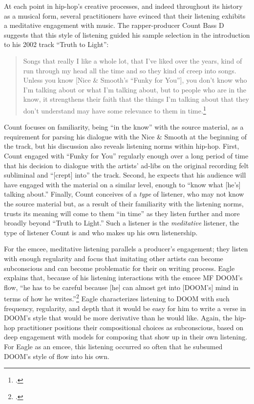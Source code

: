 At each point in hip-hop's creative processes, and indeed throughout its history as a musical form, several 
practitioners have evinced that their listening exhibits a meditative engagement with music. The rapper-producer
Count Bass D suggests that this style of listening guided his sample selection in the introduction to his 2002
track ``Truth to Light'': 
    \begin{quote}
        \small Songs that really I like a whole lot, that I've liked over the years, kind of run through my head all
        the time and so they kind of creep into songs. \textellipsis Unless you know [Nice \& Smooth's ``Funky
        for You''], you don't know who I'm talking about or what I'm talking about, but to people who are in
        the know, it strengthens their faith that the things I'm talking about that they don't understand may
        have some relevance to them in time.\footnote{
            \autocite[100]{mickeyhessHipHopDead2007}.}
    \end{quote}
Count focuses on familiarity, being ``in the know'' with the source material, as a requirement for parsing 
his dialogue with the Nice \& Smooth at the beginning of the track, but his discussion also reveals listening
norms within hip-hop. First, Count engaged with ``Funky for You'' regularly enough over a long period of time
that his decision to dialogue with the artists' ad-libs on the original recording felt subliminal and ``[crept]
into'' the track. Second, he expects that his audience will have engaged with the material on a similar level,
enough to ``know what [he's] talking about.'' Finally, Count conceives of a \emph{type} of listener, who may not
know the source material but, as a result of their familiarity with the listening norms, trusts its meaning will
come to them ``in time'' as they listen further and more broadly beyond ``Truth to Light.'' Such a listener is
the \emph{meditative} listener, the type of listener Count is and who makes up his own listenership.

For the emcee, meditative listening parallels a producer's engagement; they listen with enough regularity and
focus that imitating other artists can become subconscious and can become  problematic for their on writing
process. Eagle explains that, because of his listening interactions with the emcee MF DOOM's flow, ``he has to
be careful \textellipsis because [he] can almost get into [DOOM's] mind in terms of how he writes.''\footnote{
    \cite{estellecaswellRappingDeconstructedBest2016}.} 
Eagle characterizes listening to DOOM with such frequency, regularity, and depth that it would be easy for him
to write a verse in DOOM's style that would be more derivative than he would like. Again, the hip-hop practitioner
positions their compositional choices as subconscious, based on deep engagement with models for composing that
show up in their own listening. For Eagle as an emcee, this listening occurred so often that he subsumed DOOM's
style of flow into his own.

